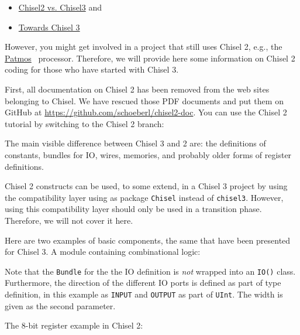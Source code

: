 \documentclass[%
    10pt, %
    headinclude, footexclude,
    openright, %
    notitlepage,
    cleardoubleempty,
    headsepline,
    pointlessnumbers,
    bibtotoc, idxtotoc,
    ]{scrbook}
\newcommand{\code}[1]{{\small{\texttt{#1}}}}
\newcommand{\myref}[2]{\href{#1}{#2}}
\begin{document}
\begin{itemize}
\item \myref{https://github.com/freechipsproject/chisel3/wiki/Chisel3-vs-Chisel2}{Chisel2 vs. Chisel3} and
\item \myref{https://github.com/schoeberl/chisel-examples/blob/master/TowardsChisel3.md}{Towards Chisel 3}
\end{itemize}

However, you might get involved in a project that still uses Chisel 2,
e.g., the \myref{https://github.com/t-crest/patmos}{Patmos}~\cite{patmos:rts2018} processor.
Therefore, we will provide here some information on Chisel 2 coding for those who
have started with Chisel 3.

First, all documentation on Chisel 2 has been removed from the web sites
belonging to Chisel. We have rescued those PDF documents and put them
on GitHub at \url{https://github.com/schoeberl/chisel2-doc}.
You can use the Chisel 2 tutorial by switching to the Chisel 2 branch:


The main visible difference between Chisel 3 and 2 are: the definitions of
constants, bundles for IO, wires, memories, and probably older forms of register
definitions.

Chisel 2 constructs can be used, to some extend, in a Chisel 3 project by
using the compatibility layer using as package \code{Chisel} instead of \code{chisel3}.
However, using this compatibility layer should only be used in a transition phase.
Therefore, we will not cover it here.

Here are two examples of basic components, the same that have been presented
for Chisel 3. A module containing combinational logic:



Note that the \code{Bundle} for the the IO definition is \emph{not} wrapped into
an \code{IO()} class.  Furthermore, the direction of the different IO ports is defined
as part of type definition, in this example as \code{INPUT} and \code{OUTPUT}
as part of \code{UInt}. The width is given as the second parameter.

\begin{minipage}{\linewidth}
The 8-bit register example in Chisel 2:


\end{minipage}
\end{document}
